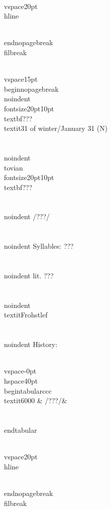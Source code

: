\\vspace{20pt}\\hline

\\end{nopagebreak}
\\filbreak



\\vspace{15pt}
\\begin{nopagebreak}
\\noindent{\\fontsize{20pt}{10pt}\\textbf{???} } \\textit{31 of winter/January 31} (N)\\\\
\\noindent {\\tovian \\fontsize{20pt}{10pt} \\textbf{???} }\\\\
\\noindent /???/\\\\
\\noindent Syllables: ???\\\\
\\noindent lit. ???\\\\
\\noindent \\textit{Frohstlef}\\\\


\\noindent History:

\\vspace{-0pt}
\\hspace{40pt}
\\begin{tabular}{ccc}
\\textit{6000} & /???/& \\\\
\\end{tabular}

\\vspace{20pt}\\hline

\\end{nopagebreak}
\\filbreak



